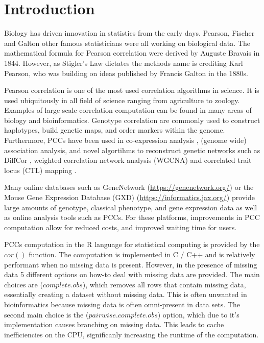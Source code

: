 \documentclass{bioinfo}
\begin{document}
\maketitle

\section{Introduction}
Biology has driven innovation in statistics from the early days. Pearson, Fischer 
and Galton other famous statisticians were all working on biological data. The 
mathematical formula for Pearson correlation were derived by Auguste Bravais in 
1844. However, as Stigler's Law \citep{Stigler1980} dictates the methods name is 
crediting Karl Pearson, who was building on ideas published by Francis Galton in 
the 1880s. 

Pearson correlation is one of the most used correlation algorithms in science. 
It is used ubiquitously in all field of science ranging from agriculture to 
zoology. Examples of large scale correlation computation can be found in many 
areas of biology and bioinformatics. Genotype correlation are commonly used to 
construct haplotypes, build genetic maps, and order markers within the genome. 
Furthermore, PCCs have been used in co-expression analysis \citep{Tesson:2010}, 
(genome wide) association analysis, and novel algortihms to reconstruct genetic 
networks such as DiffCor \citep{Fukushima:2013}, weighted correlation network 
analysis (WGCNA) \citep{Horvath:2008} and correlated trait locus (CTL) mapping 
\citep{Arends2016a}.

Many online databases such as GeneNetwork 
(\href{https://genenetwork.org/}{https://genenetwork.org/}) \citep{Sloan2016} or 
the Mouse Gene Expression Database (GXD) 
(\href{https://informatics.jax.org/}{https://informatics.jax.org/}) \citep{Finger2017}
provide large amounts of genotype, classical phenotype, and gene expression data as 
well as online analysis tools such as PCCs. For these platforms, improvements in 
PCC computation allow for reduced costs, and improved waiting time for users.

PCCs computation in the R language for statistical computing \citep{R:2005} is 
provided by the $cor()$ function. The computation is implemented in C / C++ and 
is relatively performant when no missing data is present. However, 
in the presence of missing data 5 different options on how-to deal 
with missing data are provided. The main choices are ($complete.obs$), 
which removes all rows that contain missing data, essentially 
creating a dataset without missing data. This is often unwanted in 
bioinformatics because missing data is often omni-present in data 
sets. The second main choice is the ($pairwise.complete.obs$) option, 
which due to it's implementation causes branching on missing data. This
leads to cache inefficiencies on the CPU, significanly increasing the 
runtime of the computation.
\end{document}
